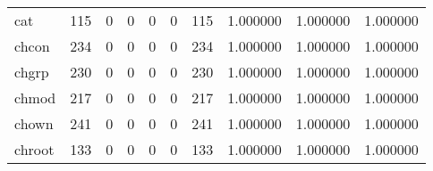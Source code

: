 \begin{longtable}{lrrrrrrrrr}
cat       &                                                115 &                                                  0 &                                                  0 &                                                  0 &                                                  0 &                                                115 &                                           1.000000 &                               1.000000 &                             1.000000 \\
chcon     &                                                234 &                                                  0 &                                                  0 &                                                  0 &                                                  0 &                                                234 &                                           1.000000 &                               1.000000 &                             1.000000 \\
chgrp     &                                                230 &                                                  0 &                                                  0 &                                                  0 &                                                  0 &                                                230 &                                           1.000000 &                               1.000000 &                             1.000000 \\
chmod     &                                                217 &                                                  0 &                                                  0 &                                                  0 &                                                  0 &                                                217 &                                           1.000000 &                               1.000000 &                             1.000000 \\
chown     &                                                241 &                                                  0 &                                                  0 &                                                  0 &                                                  0 &                                                241 &                                           1.000000 &                               1.000000 &                             1.000000 \\
chroot    &                                                133 &                                                  0 &                                                  0 &                                                  0 &                                                  0 &                                                133 &                                           1.000000 &                               1.000000 &                             1.000000 \\

\end{longtable}
